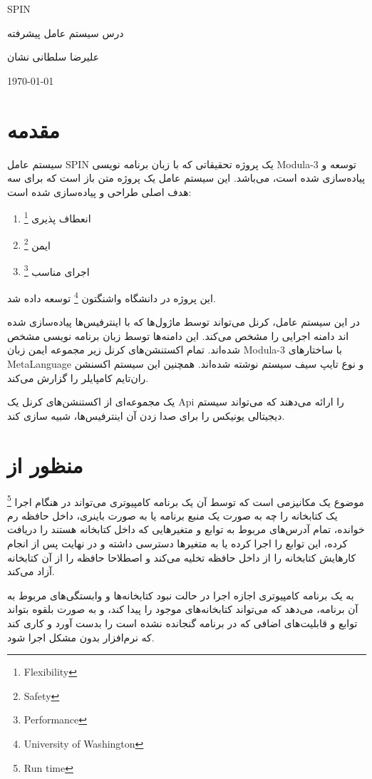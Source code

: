 \documentclass[20pt, a4paper]{article}
\begin{document}
\centerline{SPIN}
\centerline{درس سیستم عامل پیشرفته}
\centerline{علیرضا سلطانی نشان}
\centerline{\today}
\tableofcontents

\section{مقدمه}

سیستم عامل SPIN یک پروژه تحقیقاتی که با زبان برنامه نویسی Modula-3 توسعه و
پیاده‌سازی شده است، می‌باشد. این سیستم عامل یک پروژه متن باز است که برای سه هدف
اصلی طراحی و پیاده‌سازی شده است:

\begin{enumerate}
    \item انعطاف پذیری \footnote{Flexibility}
    \item ایمن \footnote{Safety}
    \item اجرای مناسب \footnote{Performance}
\end{enumerate}

این پروژه در دانشگاه واشنگتون \footnote{University of Washington} توسعه داده شد.

در این سیستم عامل، کرنل می‌تواند توسط  ماژول‌ها که با
اینترفیس‌ها پیاده‌سازی شده اند دامنه اجرایی را مشخص می‌کند. این دامنه‌ها توسط
زبان برنامه نویسی مشخص شده‌اند. تمام اکستنشن‌های کرنل زیر مجموعه ایمن زبان
Modula-3 با ساختار‌های MetaLanguage و نوع تایپ سیف سیستم نوشته شده‌اند. همچنین
این سیستم اکسنشن‌ ران‌تایم کامپایلر را گزارش می‌کند.

یک مجموعه‌ای از اکستنشن‌های کرنل یک Api را ارائه می‌دهند که می‌تواند سیستم
دیجیتالی یونیکس را برای صدا زدن آن اینترفیس‌ها، شبیه سازی کند.

\section{منظور از }

موضوع  یک مکانیزمی است که توسط آن یک برنامه کامپیوتری
می‌تواند در هنگام اجرا \footnote{Run time} یک کتابخانه را چه به صورت یک منبع
برنامه یا به صورت باینری، داخل حافظه رم خوانده، تمام آدرس‌های مربوط به توابع و
متغیر‌هایی که داخل کتابخانه هستند را دریافت کرده، این توابع را اجرا کرده یا به
متغیر‌ها دسترسی داشته و در نهایت پس از انجام کار‌هایش کتابخانه را از داخل حافظه
تخلیه می‌کند و اصطلاحا حافظه را از آن کتابخانه آزاد می‌کند.

 به یک برنامه کامپیوتری اجازه اجرا در حالت نبود کتابخانه‌ها
و وابستگی‌های مربوط به آن برنامه، می‌دهد که می‌تواند کتابخانه‌های موجود را پیدا
کند، و به صورت بلقوه بتواند توابع و قابلیت‌های اضافی که در برنامه گنجانده نشده
است را بدست آورد و کاری کند که نرم‌افزار بدون مشکل اجرا شود.
\end{document}

